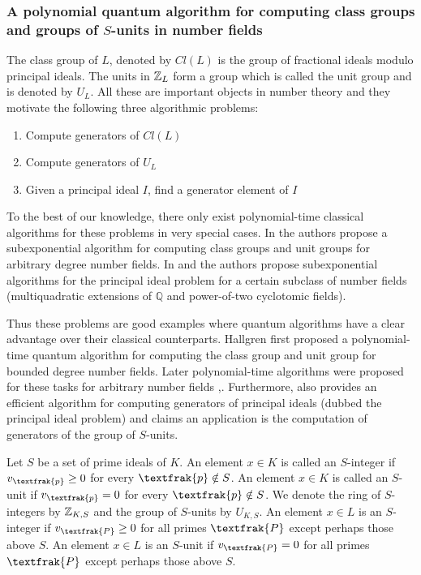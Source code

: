 \subsubsection{A polynomial quantum algorithm for computing class groups and groups of \(S\)-units in number fields}\label{subsec:quantSunit}
The class group of $L$, denoted by $Cl(L)$ is the group of fractional ideals modulo principal ideals. The units in $\mathbb{Z}_L$ form a group which is called the unit group and is denoted by $U_L$. All these are important objects in number theory and they motivate the following three algorithmic problems: 
\begin{enumerate}
    \item Compute generators of $Cl(L)$
    \item Compute generators of $U_L$ 
    \item Given a principal ideal $I$, find a generator element of $I$ 
\end{enumerate}

To the best of our knowledge, there only exist polynomial-time classical algorithms for these problems in very special cases. In \cite{biasse2014subexponential} the authors propose a subexponential algorithm for computing class groups and unit groups for arbitrary degree number fields. In \cite{bauch2017short} and \cite{biasse2017computing} the authors propose subexponential algorithms for the principal ideal problem for a certain subclass of number fields (multiquadratic extensions of $\mathbb{Q}$ and power-of-two cyclotomic fields). 

Thus these problems are good examples where quantum algorithms have a clear advantage over their classical counterparts. Hallgren \cite{hallgren2005fast} first proposed a polynomial-time quantum algorithm for computing the class group and unit group for bounded degree number fields. Later polynomial-time algorithms were proposed for these tasks for arbitrary number fields \cite{eisentrager2014quantum},\cite{biasse2016efficient}. Furthermore, \cite{biasse2016efficient} also provides an efficient algorithm for computing generators of principal ideals (dubbed the principal ideal problem) and claims an application is the computation of generators of the group of \(S\)-units.

Let $S$ be a set of prime ideals of $K$. An element $x\in K$ is called an $S$-integer if $v_{\textfrak{p}}\geq 0$ for every $\textfrak{p}\notin S$. An element $x\in K$ is called an $S$-unit if $v_{\textfrak{p}}=0$ for every $\textfrak{p}\notin S$. We denote the ring of $S$-integers by $\mathbb{Z}_{K,S}$ and the group of $S$-units by $U_{K,S}$. An element $x\in L$ is an $S$-integer if $v_{\textfrak{P}}\geq 0$ for all primes $\textfrak{P}$ except perhaps those above $S$. An element $x\in L$ is an $S$-unit if $v_{\textfrak{P}}= 0$ for all primes $\textfrak{P}$ except perhaps those above $S$.

